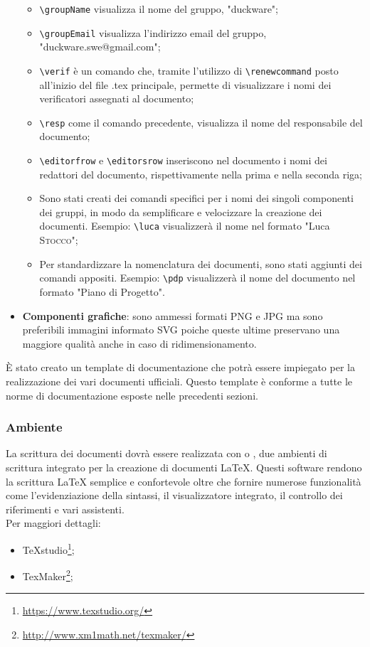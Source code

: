 \begin{itemize}
    \begin{itemize}
        \item \texttt{\textbackslash groupName} visualizza il nome del gruppo, "duckware";
        \item \texttt{\textbackslash groupEmail} visualizza l'indirizzo email del gruppo, "duckware.swe@gmail.com";
        \item \texttt{\textbackslash verif} è un comando che, tramite l'utilizzo di \texttt{\textbackslash renewcommand} posto all'inizio del file .tex principale, permette di visualizzare i nomi dei verificatori assegnati al documento;
        \item \texttt{\textbackslash resp} come il comando precedente, visualizza il nome del responsabile del documento;
        \item \texttt{\textbackslash editorfrow} e \texttt{\textbackslash editorsrow} inseriscono nel documento i nomi dei redattori del documento, rispettivamente nella prima e nella seconda riga;
        \item Sono stati creati dei comandi specifici per i nomi dei singoli componenti dei gruppi, in modo da semplificare e velocizzare la creazione dei documenti. Esempio: \texttt{\textbackslash luca} visualizzerà il nome nel formato "Luca \textsc{Stocco}";
        \item Per standardizzare la nomenclatura dei documenti, sono stati aggiunti dei comandi appositi. Esempio: \texttt{\textbackslash pdp} visualizzerà il nome del documento nel formato "Piano di Progetto".
    \end{itemize}
    \item \textbf{Componenti grafiche}: sono ammessi formati PNG e JPG ma sono preferibili immagini informato SVG poiche queste ultime preservano una maggiore qualità anche in caso di ridimensionamento.
\end{itemize}
È stato creato un template di documentazione che potrà essere impiegato per la realizzazione dei vari documenti ufficiali. Questo template è conforme a tutte le norme di documentazione esposte nelle precedenti sezioni.
\subsubsection{Ambiente}
La scrittura dei documenti dovrà essere realizzata con  o , due ambienti di scrittura integrato per la creazione di documenti LaTeX. Questi software rendono la scrittura LaTeX semplice e confortevole oltre che fornire numerose funzionalità come l'evidenziazione della sintassi, il visualizzatore integrato, il controllo dei riferimenti e vari assistenti.\\Per maggiori dettagli:
\begin{itemize}
    \item TeXstudio\footnote{\href{https://www.texstudio.org/}{https://www.texstudio.org/}};
    \item TexMaker\footnote{\href{http://www.xm1math.net/texmaker/}{http://www.xm1math.net/texmaker/}};
\end{itemize}
